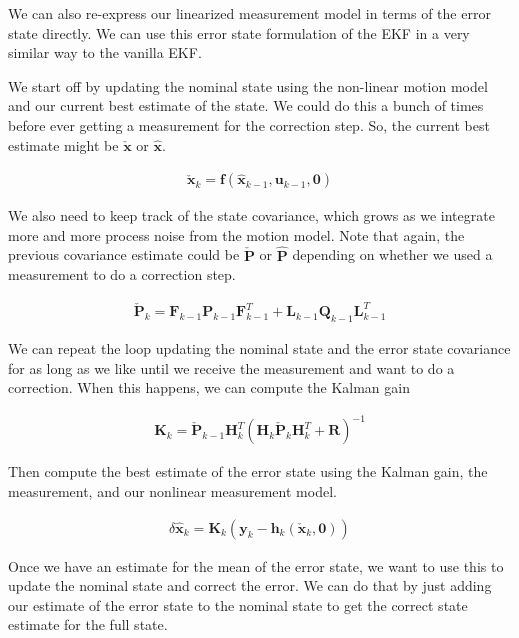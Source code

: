 We can also re-express our linearized measurement model in terms of the error state directly. 
We can use this error state formulation of the EKF in a very similar way to the vanilla EKF. 

We start off by updating the nominal state using the non-linear motion model and our current best
estimate of the state. We could do this a bunch of times before ever getting a measurement for the correction step. So, the current
best estimate might be $\check{\mathbf{x}}$ or $\hat{\mathbf{x}}$. 

\begin{eqnarray}
\check{\mathbf{x}}_{k} = \mathbf{f}(\hat{\mathbf{x}}_{k-1}, \mathbf{u}_{k-1}, \mathbf{0})
\end{eqnarray}

We also need to keep track of the state covariance, which grows as
we integrate more and more process noise from the motion model. Note that again, the previous
covariance estimate could be $\check{\mathbf{P}}$  or $\hat{\mathbf{P}}$ depending
on whether we used a measurement to do a correction step. 

\begin{eqnarray}
\check{\mathbf{P}}_{k} = \mathbf{F}_{k-1}\mathbf{P}_{k-1}\mathbf{F}_{k-1}^T + \mathbf{L}_{k-1}\mathbf{Q}_{k-1}\mathbf{L}_{k-1}^T
\end{eqnarray}

We can repeat the loop updating the nominal state and the error state covariance for as long as we like until we receive
the measurement and want to do a correction. When this happens, we can compute the Kalman gain 

\begin{eqnarray}
\mathbf{K}_{k} = \check{\mathbf{P}}_{k-1}\mathbf{H}_{k}^T(\mathbf{H}_{k}\check{\mathbf{P}}_{k}\mathbf{H}_{k}^T + \mathbf{R})^{-1}
\end{eqnarray}

Then compute the best estimate of the error state using
the Kalman gain, the measurement, and our nonlinear measurement model. 

\begin{eqnarray}
\delta \hat{\mathbf{x}}_{k} = \mathbf{K}_{k}(\mathbf{y}_{k} - \mathbf{h}_{k}(\check{\mathbf{x}}_{k},\mathbf{0}) )
\end{eqnarray}

Once we have an estimate for the mean of the error state, we want to use this to update the nominal state and
correct the error. We can do that by just adding our estimate of the error state to the nominal state to get the correct state estimate for the full state. 

